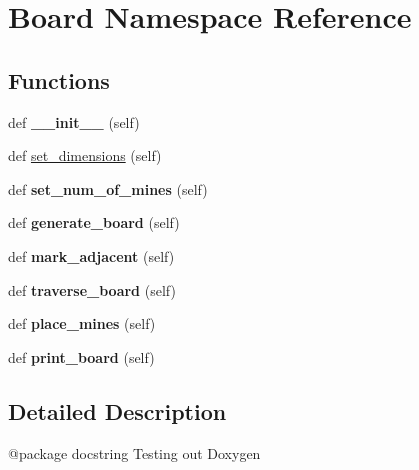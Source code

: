 \hypertarget{namespace_board}{}\section{Board Namespace Reference}
\label{namespace_board}
\subsection*{Functions}
\begin{DoxyCompactItemize}
\item 
\mbox{\label{namespace_board_afdfcb71a62d63ec884c8376a8ee9f9ac}} 
def {\bfseries \+\_\+\+\_\+init\+\_\+\+\_\+} (self)
\item 
def \hyperlink{namespace_board_ab67f816560ee2b4c90117d8d4e0507b5}{set\+\_\+dimensions} (self)
\item 
\mbox{\label{namespace_board_a39d14a09490889fd7ff5bc0c8f15920a}} 
def {\bfseries set\+\_\+num\+\_\+of\+\_\+mines} (self)
\item 
\mbox{\label{namespace_board_a774eadb4ae71d87ae34b713d342bbbbc}} 
def {\bfseries generate\+\_\+board} (self)
\item 
\mbox{\label{namespace_board_a33f19fd04d2717ce7b9debea0ddeb6b1}} 
def {\bfseries mark\+\_\+adjacent} (self)
\item 
\mbox{\label{namespace_board_a7083970af7bc1fde86d450ad5e9060d6}} 
def {\bfseries traverse\+\_\+board} (self)
\item 
\mbox{\label{namespace_board_ae503a9ae4e328845a7493c234ac8d19e}} 
def {\bfseries place\+\_\+mines} (self)
\item 
\mbox{\label{namespace_board_a75bbbde1d1661b18da044838764adf8c}} 
def {\bfseries print\+\_\+board} (self)
\end{DoxyCompactItemize}


\subsection{Detailed Description}
\begin{DoxyVerb}@package docstring
Testing out Doxygen
\end{DoxyVerb}
 

